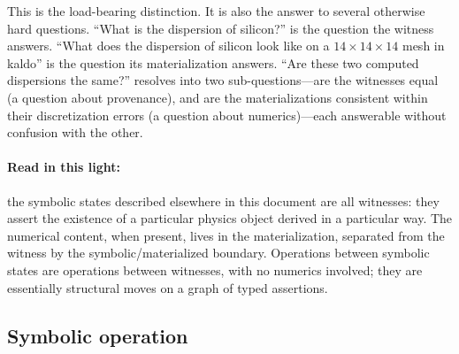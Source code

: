 \documentclass[11pt,a4paper]{article}
\begin{document}
This is the load-bearing distinction. It is also the answer to several otherwise hard questions.
``What is the dispersion of silicon?'' is the question the witness answers. ``What does the
dispersion of silicon look like on a $14\times14\times14$ mesh in kaldo'' is the question its
materialization answers. ``Are these two computed dispersions the same?'' resolves into two
sub-questions---are the witnesses equal (a question about provenance), and are the
materializations consistent within their discretization errors (a question about numerics)---each
answerable without confusion with the other.

\paragraph{Read in this light:}
the symbolic states described elsewhere in this document are all witnesses: they assert the
existence of a particular physics object derived in a particular way. The numerical content,
when present, lives in the materialization, separated from the witness by the symbolic/materialized
boundary. Operations between symbolic states are operations between witnesses, with no numerics
involved; they are essentially structural moves on a graph of typed assertions.


\subsection{Symbolic operation}
\end{document}
